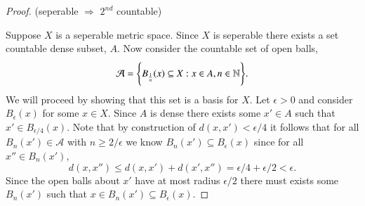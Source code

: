 \documentclass[minion]{homework651}
\begin{document}
\begin{problems}
\begin{proof} (seperable $\Rightarrow$ $2^{nd}$ countable) 

    Suppose $X$ is a seperable metric space. Since $X$ is seperable there exists a set countable dense subset, $A$. 
    Now consider the countable set of open balls, 
    \begin{equation*}
        \mathcal{A} = \Biggl\{ B_{\frac{1}{n}}(x) \subseteq X : x \in A, n \in \mathbb N \Biggr\}.
    \end{equation*}
    We will proceed by showing that this set is a basis for $X$. Let $\epsilon > 0$ and consider $B_{\epsilon}(x)$ for some $x \in X$. Since $A$ is dense there exists some $x' \in A$ such that $x' \in B_{\epsilon/4}(x)$. Note that by construction of $d(x, x') < \epsilon/4$ it follows that for all $B_{n}(x') \in \mathcal{A}$ with $n \geq 2/\epsilon$ we know $B_{n}(x') \subseteq B_{\epsilon}(x)$ since for all $x'' \in B_{n}(x')$, 
    \begin{equation*}
        d(x,x'') \leq d(x,x') + d(x', x'') = \epsilon/4 + \epsilon/2 < \epsilon.
    \end{equation*}
   Since the open balls about $x'$ have at most radius $\epsilon/2$ there must exists some $B_n(x')$ such that $x \in B_n(x') \subseteq B_\epsilon(x)$.
\end{proof}


\end{problems}
\end{document}
